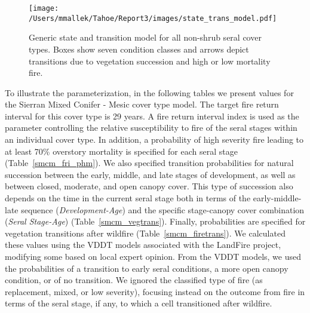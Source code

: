 \begin{figure}[htbp]
\centering
\texttt{[image: /Users/mmallek/Tahoe/Report3/images/state\_trans\_model.pdf]}
\caption{Generic state and transition model for all non-shrub seral cover types. Boxes show seven condition classes and arrows depict transitions due to vegetation succession and high or low mortality fire.} 
\label{transmodel}
\end{figure}

To illustrate the parameterization, in the following tables we present values for the Sierran Mixed Conifer - Mesic cover type model. The target fire return interval for this cover type is 29 years. A fire return interval index is used as the parameter controlling the relative susceptibility to fire of the seral stages within an individual cover type. In addition, a probability of high severity fire leading to at least 70\% overstory mortality is specified for each seral stage (Table~\ref{smcm_fri_phm}). We also specified transition probabilities for natural succession between the early, middle, and late stages of development, as well as between closed, moderate, and open canopy cover. This type of succession also depends on the time in the current seral stage both in terms of the early-middle-late sequence (\emph{Development-Age}) and the specific stage-canopy cover combination (\emph{Seral Stage-Age}) (Table~\ref{smcm_vegtrans}). Finally, probabilities are specified for vegetation transitions after wildfire (Table~\ref{smcm_firetrans}). We calculated these values using the VDDT models associated with the LandFire project, modifying some based on local expert opinion. From the VDDT models, we used the probabilities of a transition to early seral conditions, a more open canopy condition, or of no transition. We ignored the classified type of fire (as replacement, mixed, or low severity), focusing instead on the outcome from fire in terms of the seral stage, if any, to which a cell transitioned after wildfire.

